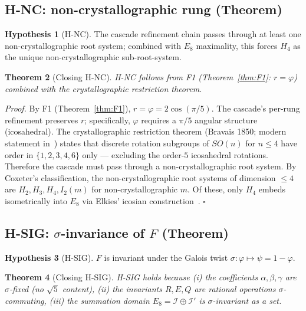 \documentclass[11pt]{article}
\theoremstyle{plain}
\newtheorem{theorem}{Theorem}[section]
\theoremstyle{definition}
\newtheorem{hypothesis}[theorem]{Hypothesis}
\theoremstyle{remark}
\newcommand{\Ical}{\mathcal{I}}
\begin{document}
\subsection{H-NC: non-crystallographic rung (Theorem)}\label{sec:discharge-HNC}

\begin{hypothesis}[H-NC]
The cascade refinement chain passes through at least one non-crystallographic root system; combined with $E_8$ maximality, this forces $H_4$ as the unique non-crystallographic sub-root-system.
\end{hypothesis}

\begin{theorem}[Closing H-NC]\label{thm:close-HNC}
H-NC follows from F1 (Theorem~\ref{thm:F1}: $r = \varphi$) combined with the crystallographic restriction theorem.
\end{theorem}

\noindent\emph{Proof.}
By F1 (Theorem~\ref{thm:F1}), $r = \varphi = 2\cos(\pi/5)$. The cascade's per-rung refinement preserves $r$; specifically, $\varphi$ requires a $\pi/5$ angular structure (icosahedral). The crystallographic restriction theorem (Bravais 1850; modern statement in~\citealp{Coxeter1973}) states that discrete rotation subgroups of $SO(n)$ for $n \le 4$ have order in $\{1, 2, 3, 4, 6\}$ only --- excluding the order-$5$ icosahedral rotations. Therefore the cascade must pass through a non-crystallographic root system. By Coxeter's classification, the non-crystallographic root systems of dimension $\le 4$ are $H_2, H_3, H_4, I_2(m)$ for non-crystallographic $m$. Of these, only $H_4$ embeds isometrically into $E_8$ via Elkies' icosian construction~\citep{Elkies1990}. \hfill$\square$

\subsection{H-SIG: $\sigma$-invariance of $F$ (Theorem)}\label{sec:discharge-HSIG}

\begin{hypothesis}[H-SIG]
$F$ is invariant under the Galois twist $\sigma: \varphi \mapsto \psi = 1 - \varphi$.
\end{hypothesis}

\begin{theorem}[Closing H-SIG]\label{thm:close-HSIG}
H-SIG holds because (i) the coefficients $\alpha, \beta, \gamma$ are $\sigma$-fixed (no $\sqrt 5$ content), (ii) the invariants $R, E, Q$ are rational operations $\sigma$-commuting, (iii) the summation domain $E_8 = \Ical \oplus \Ical'$ is $\sigma$-invariant as a set.
\end{theorem}
\end{document}
